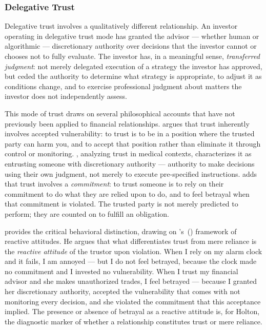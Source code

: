 \subsubsection{Delegative Trust}
\label{subsubsec:delegative_trust}

Delegative trust involves a qualitatively different relationship. An investor operating in delegative trust mode has granted the advisor --- whether human or algorithmic --- discretionary authority over decisions that the investor cannot or chooses not to fully evaluate. The investor has, in a meaningful sense, \textit{transferred judgment}: not merely delegated execution of a strategy the investor has approved, but ceded the authority to determine what strategy is appropriate, to adjust it as conditions change, and to exercise professional judgment about matters the investor does not independently assess.

This mode of trust draws on several philosophical accounts that have not previously been applied to financial relationships. \citet{Baier1986} argues that trust inherently involves accepted vulnerability: to trust is to be in a position where the trusted party can harm you, and to accept that position rather than eliminate it through control or monitoring. \citet{Nickel2012}, analyzing trust in medical contexts, characterizes it as entrusting someone with discretionary authority --- authority to make decisions using their own judgment, not merely to execute pre-specified instructions. \citet{Hawley2014} adds that trust involves a \textit{commitment}: to trust someone is to rely on their commitment to do what they are relied upon to do, and to feel betrayal when that commitment is violated. The trusted party is not merely predicted to perform; they are counted on to fulfill an obligation.

\citet{Holton1994} provides the critical behavioral distinction, drawing on \citeauthor{Strawson1962}'s~(\citeyear{Strawson1962}) framework of reactive attitudes. He argues that what differentiates trust from mere reliance is the \textit{reactive attitude} of the trustor upon violation. When I rely on my alarm clock and it fails, I am annoyed --- but I do not feel betrayed, because the clock made no commitment and I invested no vulnerability. When I trust my financial advisor and she makes unauthorized trades, I feel betrayed --- because I granted her discretionary authority, accepted the vulnerability that comes with not monitoring every decision, and she violated the commitment that this acceptance implied. The presence or absence of betrayal as a reactive attitude is, for Holton, the diagnostic marker of whether a relationship constitutes trust or mere reliance.

